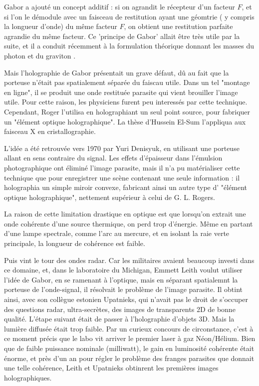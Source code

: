\documentclass[a4paper,12pt]{article}
\begin{document}
Gabor a ajouté un concept additif : si on agrandit le récepteur d'un facteur $F$, et si l'on le démodule avec un faisceau de restitution ayant une géomtrie ( y compris la longueur d'onde) du même facteur $F$, on obtient une restitution parfaite agrandie du même facteur. Ce 'principe de Gabor' allait être très utile par la suite, et il a conduit récemment à la formulation théorique donnant les masses du photon et du graviton \cite{Sanchez}.



Mais l'holographie de Gabor présentait un grave défaut, dû au fait que la porteuse n'était pas spatialement séparée du faiscau utile. Dans un tel "montage en ligne", il se produit une onde restituée parasite qui vient brouiller l'image utile. Pour cette raison, les physiciens furent peu interessés par cette technique. Cependant, Roger l'utilisa en holographiant un seul point source, pour fabriquer un "élément optique holographique". La thèse d'Hussein El-Sum l'appliqua aux faisceau X en cristallographie. 


L'idée a été retrouvée vers 1970 par Yuri Denisyuk, en utilisant une porteuse allant en sens contraire du signal. Les effets d'épaisseur dans l'émulsion photographique ont éliminé l'image parasite, mais il n'a pu matérialiser cette technique que pour enregistrer une scène contenant une seule information : il holographia un simple miroir convexe, fabricant ainsi un autre type d' "élément optique holographique", nettement supérieur à celui de G. L. Rogers.


La raison de cette limitation drastique en optique est que lorsqu'on extrait une onde cohérente d'une source thermique, on perd trop d'énergie. Même en partant d'une lampe spectrale, comme l'arc au mercure, et en isolant la raie verte principale, la longueur de cohérence est faible. 


Puis vint le tour des ondes radar. Car les militaires avaient beaucoup investi dans ce domaine, et, dans le laboratoire du Michigan, Emmett Leith voulut utiliser l'idée de Gabor, en se ramenant à l'optique, mais en séparant spatialemnt la porteuse de l'onde-signal, il résolvait le problème de l'image parasite. Il obtint ainsi, avec son collègue estonien Upatnieks, qui n'avait pas le droit de s'occuper des questions radar, ultra-secrètes, des images de transparents 2D de bonne qualité. L'étape suivant était de passer à l'holographie d'objets 3D. Mais la lumière diffusée était trop faible. Par un curieux concours de circonstance, c'est à ce moment précis que le labo vit arriver le premier laser à gaz Néon/Hélium. Bien que de faible puissance nominale (milliwatt), le gain en luminosité cohérente était énorme, et près d'un an pour régler le problème des franges parasites que donnait une telle cohérence, Leith et Upatnieks obtinrent les premières images holographiques.
\end{document}

